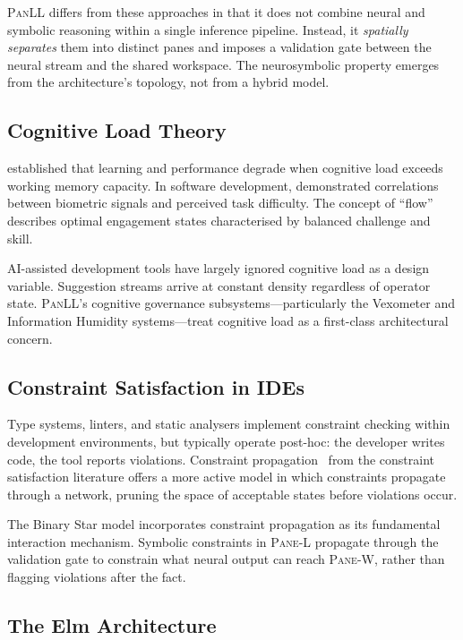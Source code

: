 \documentclass[11pt,a4paper]{article}
\newcommand{\paneL}{\textsc{Pane-L}}
\newcommand{\paneW}{\textsc{Pane-W}}
\newcommand{\panll}{\textsc{PanLL}}
\begin{document}
\panll{} differs from these approaches in that it does not combine
neural and symbolic reasoning within a single inference pipeline.
Instead, it \textit{spatially separates} them into distinct panes
and imposes a validation gate between the neural stream and the
shared workspace. The neurosymbolic property emerges from the
architecture's topology, not from a hybrid model.

\subsection{Cognitive Load Theory}

\citet{sweller1988cognitive} established that learning and
performance degrade when cognitive load exceeds working memory
capacity. In software development, \citet{fritz2014using}
demonstrated correlations between biometric signals and
perceived task difficulty. The concept of ``flow''
\citep{csikszentmihalyi1990flow} describes optimal engagement
states characterised by balanced challenge and skill.

AI-assisted development tools have largely ignored cognitive load
as a design variable. Suggestion streams arrive at constant density
regardless of operator state. \panll{}'s cognitive governance
subsystems---particularly the Vexometer and Information Humidity
systems---treat cognitive load as a first-class architectural concern.

\subsection{Constraint Satisfaction in IDEs}

Type systems, linters, and static analysers implement constraint
checking within development environments, but typically operate
post-hoc: the developer writes code, the tool reports violations.
Constraint propagation~\citep{mackworth1977consistency} from the
constraint satisfaction literature offers a more active model in
which constraints propagate through a network, pruning the space
of acceptable states before violations occur.

The Binary Star model incorporates constraint propagation as its
fundamental interaction mechanism. Symbolic constraints in \paneL{}
propagate through the validation gate to constrain what neural output
can reach \paneW{}, rather than flagging violations after the fact.

\subsection{The Elm Architecture}
\end{document}
